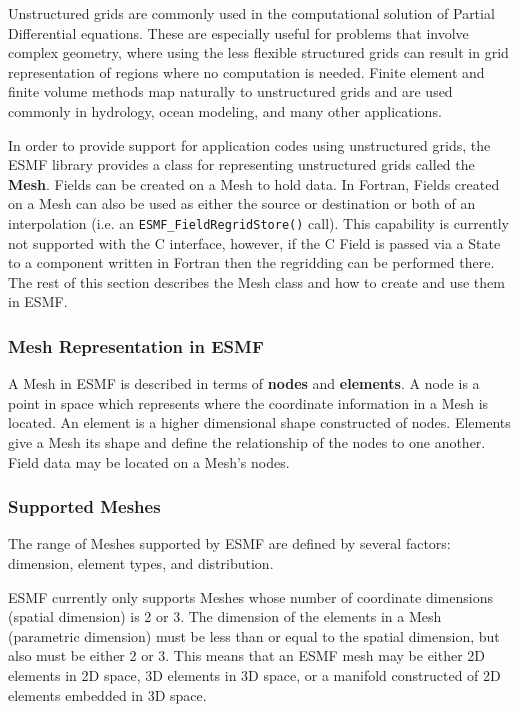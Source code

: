 
Unstructured grids are commonly used in the computational solution of Partial Differential equations.  These are especially useful for problems that involve complex geometry, where using the less flexible structured grids can
result in grid representation of regions where no computation is needed.  Finite
element and finite volume methods map naturally to unstructured grids and are used commonly
in hydrology, ocean modeling, and many other applications.

In order to provide support for application codes using unstructured grids, the ESMF library provides a class for representing 
unstructured grids called the {\bf Mesh}. Fields can be created on a Mesh to hold data. In Fortran, Fields created on a Mesh can also be used 
as either the source or destination or both of an interpolation (i.e. an {\tt ESMF\_FieldRegridStore()} call). This capability is currently
not supported with the C interface, however, if the C Field is passed via a State to a component written in Fortran then the regridding
can be performed there. The rest of this section describes the Mesh class and how to create and use them in ESMF. 

\subsubsection{Mesh Representation in ESMF}

A Mesh in ESMF is described in terms of {\bf nodes} and {\bf elements}. A node is a point in space which represents where the coordinate 
information in a Mesh is located. An element is a higher dimensional shape constructed of nodes. Elements give a Mesh its shape and define the relationship of the nodes to one another. Field data may be located on a Mesh's nodes. 

\subsubsection{Supported Meshes}

The range of Meshes supported by ESMF are defined by several factors: dimension, element types, and distribution.

ESMF currently only supports Meshes whose number of coordinate dimensions (spatial dimension) is 2 or 3. The dimension of the elements in a Mesh
(parametric dimension) must be less than or equal to the spatial dimension, but also must be either 2 or 3. This means that an ESMF mesh may be
either 2D elements in 2D space, 3D elements in 3D space, or a manifold constructed of 2D elements embedded in 3D space. 

